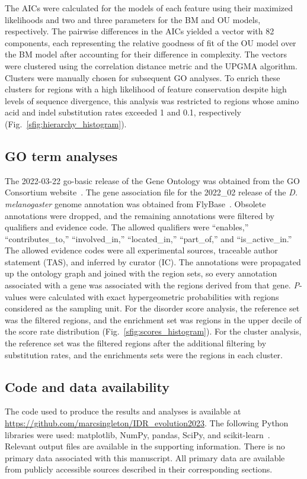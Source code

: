 The AICs were calculated for the models of each feature using their maximized likelihoods and two and three parameters for the BM and OU models, respectively. The pairwise differences in the AICs yielded a vector with 82 components, each representing the relative goodness of fit of the OU model over the BM model after accounting for their difference in complexity. The vectors were clustered using the correlation distance metric and the UPGMA algorithm. Clusters were manually chosen for subsequent GO analyses. To enrich these clusters for regions with a high likelihood of feature conservation despite high levels of sequence divergence, this analysis was restricted to regions whose amino acid and indel substitution rates exceeded 1 and 0.1, respectively (Fig.~\ref{sfig:hierarchy_histogram}).

\subsection{GO term analyses}
The 2022-03-22 go-basic release of the Gene Ontology was obtained from the GO Consortium website~\cite{Ashburner2000, 2020GOConsortium}. The gene association file for the 2022\_02 release of the \textit{D. melanogaster} genome annotation was obtained from FlyBase~\cite{Gramates2022}. Obsolete annotations were dropped, and the remaining annotations were filtered by qualifiers and evidence code. The allowed qualifiers were ``enables,'' ``contributes\_to,'' ``involved\_in,'' ``located\_in,'' ``part\_of,'' and ``is\_active\_in.'' The allowed evidence codes were all experimental sources, traceable author statement (TAS), and inferred by curator (IC). The annotations were propagated up the ontology graph and joined with the region sets, so every annotation associated with a gene was associated with the regions derived from that gene. \textit{P}-values were calculated with exact hypergeometric probabilities with regions considered as the sampling unit. For the disorder score analysis, the reference set was the filtered regions, and the enrichment set was regions in the upper decile of the score rate distribution (Fig.~\ref{sfig:scores_histogram}). For the cluster analysis, the reference set was the filtered regions after the additional filtering by substitution rates, and the enrichments sets were the regions in each cluster.

\subsection{Code and data availability}
\begin{sloppypar}
The code used to produce the results and analyses is available at \url{https://github.com/marcsingleton/IDR_evolution2023}. The following Python libraries were used: matplotlib, NumPy, pandas, SciPy, and scikit-learn~\cite{Hunter2007, Harris2020, McKinney2010, Virtanen2020, Pedregosa2011}. Relevant output files are available in the supporting information. There is no primary data associated with this manuscript. All primary data are available from publicly accessible sources described in their corresponding sections.
\end{sloppypar}
